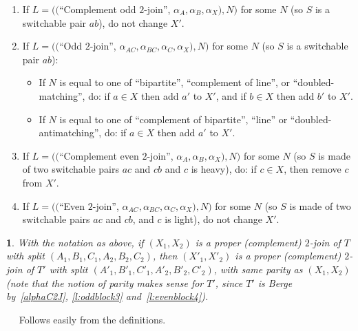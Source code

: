 \documentclass[11 pt] {article}
\newcommand\blackslug{\hbox{\hskip 1pt \vrule width 4pt height 8pt depth 1.5pt
        \hskip 1pt}}
\newcommand\bbox{\hfill \quad \blackslug \medbreak}
\newtheorem{theorem}{}[section]
\newcounter{claim}
\newcommand{\Proof}{\setcounter{claim}{0}\noindent{\bf Proof.}\ \ }
\begin{document}
\begin{enumerate}
\item If $L = (($``Complement odd $2$-join'', $\alpha_A, \alpha_B,
  \alpha_X), N)$ for some $N$ (so $S$ is a switchable pair $ab$), do not change $X'$.


\item If  $L = (($``Odd $2$-join'', $\alpha_{AC}, \alpha_{BC},
  \alpha_C, \alpha_X), N)$ for some $N$ (so $S$ is a switchable pair
  $ab$): 
  \begin{itemize}  
  \item If $N$ is equal to one of ``bipartite'', ``complement of
    line'', or ``doubled-matching'', do: 
    if $a\in X$ then add $a'$ to $X'$, and if $b \in X$ then add $b'$ to $X'$.

\item If $N$ is equal to one of ``complement of bipartite'',
    ``line'' or ``doubled-antimatching'', do:  
    if $a\in X$ then add $a'$ to $X'$.
\end{itemize}

\item If $L = (($``Complement even $2$-join'', $\alpha_A, \alpha_B,
  \alpha_X), N)$ for some $N$ (so $S$ is made of two switchable pairs
  $ac$ and $cb$ and $c$ is heavy), do: if $c \in X$, then remove $c$ from $X'$.

\item If $L = (($``Even $2$-join'', $\alpha_{AC}, \alpha_{BC},
  \alpha_C, \alpha_X), N)$ for some $N$ (so $S$ is made of two
  switchable pairs $ac$ and $cb$, and $c$ is light), do not change $X'$.

\end{enumerate}




\begin{theorem}
  \label{l:expDec}
  With the notation as above, if $(X_1, X_2)$ is a proper (complement)
  $2$-join of $T$ with split $(A_1, B_1, C_1, A_2, B_2, C_2)$, then
  $(X'_1, X'_2)$ is a proper (complement) $2$-join of $T'$ with split
  $(A'_1, B'_1, C'_1, A'_2, B'_2, C'_2)$, with same parity as $(X_1,
  X_2)$ (note that the notion of parity makes sense for $T'$, since
  $T'$ is Berge by~\ref{alphaC2J}, \ref{l:oddblock3} and~\ref{l:evenblock4}).
\end{theorem}

\Proof
Follows easily from the definitions. 
\bbox
\end{document}

